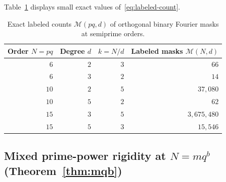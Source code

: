 \documentclass[11pt,reqno]{amsart}
\numberwithin{equation}{section}
\theoremstyle{definition}
\theoremstyle{remark}
\begin{document}
Table~\ref{tab:pq-masks} displays small exact values of~\eqref{eq:labeled-count}.

\begin{table}[ht]
\centering
\caption{Exact labeled counts $\mathcal{M}(pq,d)$ of orthogonal binary Fourier masks at semiprime orders.}
\label{tab:pq-masks}
\begin{tabular}{rrrr}
\toprule
Order $N=pq$ & Degree $d$ & $k=N/d$ & Labeled masks $\mathcal{M}(N,d)$ \\
\midrule
$6$ & $2$ & $3$ & $66$ \\
$6$ & $3$ & $2$ & $14$ \\
$10$ & $2$ & $5$ & $37{,}080$ \\
$10$ & $5$ & $2$ & $62$ \\
$15$ & $3$ & $5$ & $3{,}675{,}480$ \\
$15$ & $5$ & $3$ & $15{,}546$ \\
\bottomrule
\end{tabular}
\end{table}

\subsection{Mixed prime-power rigidity at $N=mq^b$ (Theorem~\ref{thm:mqb})}
\end{document}
